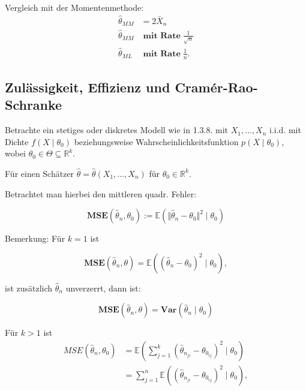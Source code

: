 \documentclass[10pt]{article}
\newcommand{\FZV}{X_1, \ldots, X_n} %
\newcommand{\IR}{\mathbb{R}} %
\newcommand{\EW}{\mathbb{E}} %
\newenvironment{BSP}[1][]
{\begin{Beispiel}[frametitle=#1]}{\end{Beispiel}}
\begin{document}
\begin{BSP}[Beispiel 1.3.11 (Grenzverteilung keine Normalverteilung)]
		Vergleich mit der Momentenmethode:
		\begin{equation*}
			\begin{split}
				\hat{\theta}_{MM}& = 2 \bar{X}_n\\
				\hat{\theta}_{MM}& \; \textbf{mit Rate} \;\frac{1}{\sqrt{n}}\\
				\hat{\theta}_{ML}& \; \textbf{mit Rate} \;\frac{1}{n}.
			\end{split}
		\end{equation*}
	\end{BSP}
	
	\subsection{Zulässigkeit, Effizienz und Cramér-Rao-Schranke}
	
	Betrachte ein stetiges oder diskretes Modell wie in 1.3.8. mit $\FZV$ i.i.d. mit Dichte $f(X\mid \theta_0)$ beziehungsweise Wahrscheinlichkeitsfunktion $p(X \mid \theta_0)$, wobei $\theta_0 \in \Theta \subseteq \IR^k$. 
	
	Für einen Schätzer $\hat{\theta} = \hat{\theta}(X_1, \ldots, X_n)$ für $\theta_0 \in \IR^k$.
	
	Betrachtet man hierbei den mittleren quadr. Fehler:
	
	\begin{equation*}
		\textbf{MSE}(\hat{\theta}_n, \theta_0) := \EW (\Vert {\hat{\theta}_n-\theta_0}\Vert ^2 \mid \theta_0)
	\end{equation*}
	
	Bemerkung: Für $k = 1$ ist 
	
	\begin{equation*}
			\textbf{MSE} (\hat{\theta}_n, \theta) = \EW (( {\hat{\theta}_n-\theta_0} )^2 \mid \theta_0),
	\end{equation*}
	
	ist zusätzlich 	$\hat{\theta}_n$ unverzerrt, dann ist: 
	
	\begin{equation*}
		\textbf{MSE} (\hat{\theta}_n, \theta) =  \textbf{Var}(\hat{\theta}_n \mid \theta_0)
	\end{equation*}
	
	Für $k>1$ ist 
	\begin{equation*}
		\begin{split}
			MSE(\hat{\theta}_n, \theta_0) &= \EW(\sum_{j=1}^{k}(\hat{\theta}_{n_{ji}} - \theta_{0_{ij}})^2 \mid \theta_0 )\\
			&= \sum_{j=1}^{n} \EW ((\hat{\theta}_{n_{ji}} - \theta_{0_{ij}})^2 \mid \theta_0),
		\end{split}
	\end{equation*}
	
\end{document}
